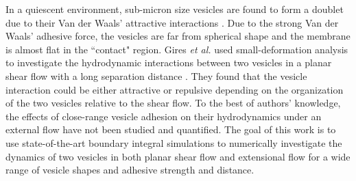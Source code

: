 \documentclass[aps,prl,twocolumn,showpacs,amsmath,amssymb]{revtex4-1}
\begin{document}
%

In a quiescent environment, sub-micron size vesicles are found to form a doublet due to their Van der Waals' attractive interactions \cite{RamachandranAndersonLealIsraelachvili2010_Langmuir}. Due to the strong Van der Waals' adhesive force, the vesicles are far from spherical shape and the membrane is almost flat in the ``contact" region. Gires {\it et al.} used small-deformation analysis to investigate the hydrodynamic
interactions between two vesicles in a planar shear flow with a long separation distance \cite{GiresDankerMisbah2012_PRE}. They found that the vesicle interaction could be either attractive or repulsive depending on the organization of the two vesicles relative to the shear flow. To the best of authors' knowledge,
the effects of close-range vesicle adhesion on their hydrodynamics under an external flow have not been studied and quantified. The goal of this work is to use
state-of-the-art boundary integral simulations to numerically investigate the dynamics of two vesicles in both planar shear flow and extensional flow for a wide range of vesicle shapes and adhesive strength and distance.
\end{document}
